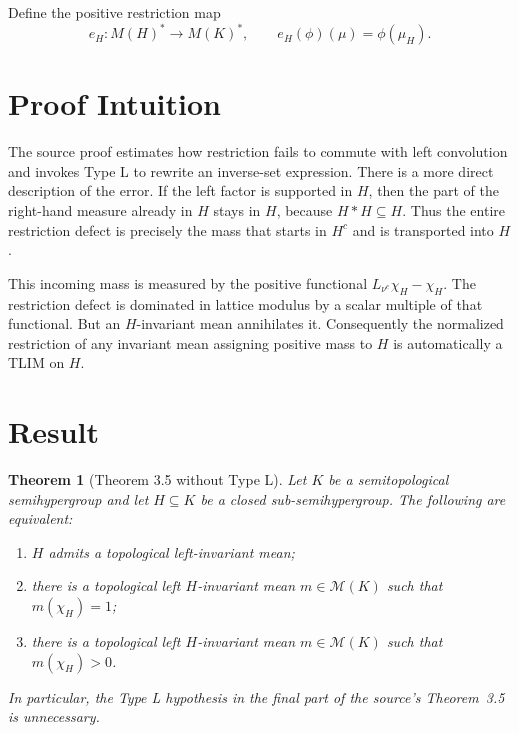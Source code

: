 \documentclass[11pt]{article}
\newtheorem{theorem}{Theorem}
\newcommand{\M}{\mathcal M}
\begin{document}
Define the positive restriction map
\[
 e_H:M(H)^*\longrightarrow M(K)^*,
 \qquad e_H(\phi)(\mu)=\phi(\mu_H).
\]

\section{Proof Intuition}

The source proof estimates how restriction fails to commute with left
convolution and invokes Type L to rewrite an inverse-set expression.  There is
a more direct description of the error.  If the left factor is supported in
$H$, then the part of the right-hand measure already in $H$ stays in $H$,
because $H*H\subseteq H$.  Thus the entire restriction defect is precisely the
mass that starts in $H^c$ and is transported into $H$.

This incoming mass is measured by the positive functional
$L_{\nu^e}\chi_H-\chi_H$.  The restriction defect is dominated in lattice
modulus by a scalar multiple of that functional.  But an $H$-invariant mean
annihilates it.  Consequently the normalized restriction of any invariant
mean assigning positive mass to $H$ is automatically a TLIM on $H$.

\section{Result}

\begin{theorem}[Theorem 3.5 without Type L]\label{thm:main}
Let $K$ be a semitopological semihypergroup and let $H\subseteq K$ be a closed
sub-semihypergroup.  The following are equivalent:
\begin{enumerate}[label=\textup{(\arabic*)}]
  \item $H$ admits a topological left-invariant mean;
  \item there is a topological left $H$-invariant mean $m\in\M(K)$ such that
        $m(\chi_H)=1$;
  \item there is a topological left $H$-invariant mean $m\in\M(K)$ such that
        $m(\chi_H)>0$.
\end{enumerate}
In particular, the Type L hypothesis in the final part of the source's
Theorem~3.5 is unnecessary.
\end{theorem}
\end{document}

